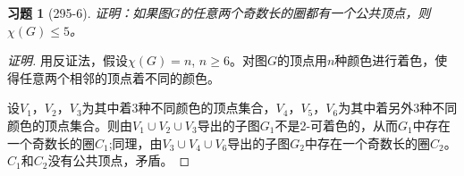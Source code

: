 \documentclass{article}
\begin{document}
\begin{CJK}{UTF8}{gbsn}
  \newtheorem*{Exercise}{习题}
\begin{Exercise}[295-6]
  证明：如果图$G$的任意两个奇数长的圈都有一个公共顶点，则$\chi (G) \leq 5$。
\end{Exercise}
\begin{proof}[证明]
  用反证法，假设$\chi(G)=n$, $n \geq 6$。对图$G$的顶点用$n$种颜色进行着色，使得任意两个相邻的顶点着不同的颜色。

  设$V_1$，$V_2$，$V_3$为其中着3种不同颜色的顶点集合，$V_4$，$V_5$，$V_6$为其中着另外3种不同颜色的顶点集合。则由$V_1\cup V_2\cup V_3$导出的子图$G_1$不是2-可着色的，从而$G_1$中存在一个奇数长的圈$C_1$;同理，由$V_3\cup V_4\cup V_6$导出的子图$G_2$中存在一个奇数长的圈$C_2$。$C_1$和$C_2$没有公共顶点，矛盾。
\end{proof}
\end{CJK}
\end{document}
